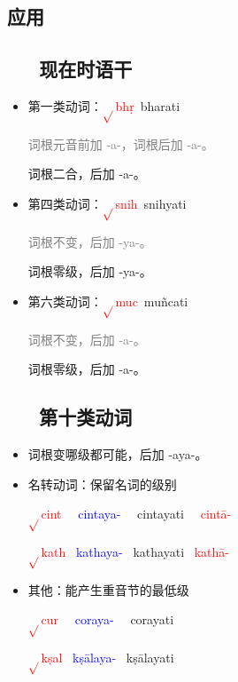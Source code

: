 \documentclass[17pt]{beamer}
\newcommand{\verbroot}[1]{\textcolor{red}{$\sqrt{}$#1}}
\newcommand{\nounstem}[1]{\textcolor{red}{#1\nobreakdash-}}
\newcommand{\verbstem}[1]{\textcolor{blue}{#1\nobreakdash-}}
\newcommand{\fullpada}[1]{\textcolor{OliveGreen}{#1}}
\newcommand{\notsoimportant}[1]{\textcolor{gray}{#1}}
\begin{document}
\subsection{应用}

\subsection{~~~现在时语干}
\begin{frame}{\insertsubsection }
  \begin{itemize}
    \item 第一类动词：\verbroot{bhṛ}~\fullpada{bharati}
    
    \notsoimportant{词根元音前加 \nobreakdash-a\nobreakdash-，词根后加 \nobreakdash-a\nobreakdash-。}

    词根二合，后加 \nobreakdash-a\nobreakdash-。
    \item 第四类动词：\verbroot{snih}~\fullpada{snihyati}
      
    \notsoimportant{词根不变，后加 \nobreakdash-ya\nobreakdash-。}

    词根零级，后加 \nobreakdash-ya\nobreakdash-。
    \item 第六类动词：\verbroot{muc}~\fullpada{muñcati}
    
    \notsoimportant{词根不变，后加 \nobreakdash-a\nobreakdash-。}

    词根零级，后加 \nobreakdash-a\nobreakdash-。
  \end{itemize}
\end{frame}

\subsection{~~~第十类动词}
\begin{frame}{\insertsubsection}
  \begin{itemize}
    \item
      词根变哪级都可能，后加 \nobreakdash-aya\nobreakdash-。
    \item 名转动词：保留名词的级别
    
    \verbroot{cint} ~~\verbstem{cintaya} ~~\fullpada{cintayati} ~~\nounstem{cintā}

    \verbroot{kath} ~\verbstem{kathaya} ~\fullpada{kathayati} ~\nounstem{kathā}
    \item 其他：能产生重音节的最低级

    \verbroot{cur} ~~\verbstem{coraya} ~~\fullpada{corayati}

    \verbroot{kṣal} ~\verbstem{kṣālaya} ~\fullpada{kṣālayati}
  \end{itemize}    
\end{frame}
\end{document}
